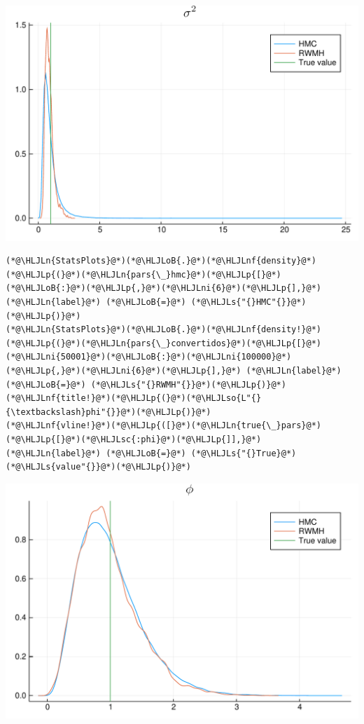 \documentclass[12pt,a4paper]{article}
\newcommand{\HLJLn}[1]{#1}
\newcommand{\HLJLnf}[1]{\textcolor[RGB]{66,102,213}{#1}}
\newcommand{\HLJLs}[1]{\textcolor[RGB]{201,61,57}{#1}}
\newcommand{\HLJLsc}[1]{\textcolor[RGB]{201,61,57}{#1}}
\newcommand{\HLJLso}[1]{\textcolor[RGB]{201,61,57}{#1}}
\newcommand{\HLJLni}[1]{\textcolor[RGB]{59,151,46}{#1}}
\newcommand{\HLJLoB}[1]{\textcolor[RGB]{102,102,102}{\textbf{#1}}}
\newcommand{\HLJLp}[1]{#1}
\begin{document}
\includegraphics[width=\linewidth]{figures/dsge_and_julia_48_1.pdf}

\begin{lstlisting}
(*@\HLJLn{StatsPlots}@*)(*@\HLJLoB{.}@*)(*@\HLJLnf{density}@*)(*@\HLJLp{(}@*)(*@\HLJLn{pars{\_}hmc}@*)(*@\HLJLp{[}@*)(*@\HLJLoB{:}@*)(*@\HLJLp{,}@*)(*@\HLJLni{6}@*)(*@\HLJLp{],}@*) (*@\HLJLn{label}@*) (*@\HLJLoB{=}@*) (*@\HLJLs{"{}HMC"{}}@*)(*@\HLJLp{)}@*)
(*@\HLJLn{StatsPlots}@*)(*@\HLJLoB{.}@*)(*@\HLJLnf{density!}@*)(*@\HLJLp{(}@*)(*@\HLJLn{pars{\_}convertidos}@*)(*@\HLJLp{[}@*)(*@\HLJLni{50001}@*)(*@\HLJLoB{:}@*)(*@\HLJLni{100000}@*)(*@\HLJLp{,}@*)(*@\HLJLni{6}@*)(*@\HLJLp{],}@*) (*@\HLJLn{label}@*) (*@\HLJLoB{=}@*) (*@\HLJLs{"{}RWMH"{}}@*)(*@\HLJLp{)}@*)
(*@\HLJLnf{title!}@*)(*@\HLJLp{(}@*)(*@\HLJLso{L"{}{\textbackslash}phi"{}}@*)(*@\HLJLp{)}@*)
(*@\HLJLnf{vline!}@*)(*@\HLJLp{([}@*)(*@\HLJLn{true{\_}pars}@*)(*@\HLJLp{[}@*)(*@\HLJLsc{:phi}@*)(*@\HLJLp{]],}@*) (*@\HLJLn{label}@*) (*@\HLJLoB{=}@*) (*@\HLJLs{"{}True}@*) (*@\HLJLs{value"{}}@*)(*@\HLJLp{)}@*)
\end{lstlisting}

\includegraphics[width=\linewidth]{figures/dsge_and_julia_49_1.pdf}
\end{document}
